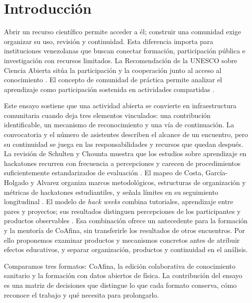 \section{Introducción}
Abrir un recurso científico permite acceder a él; construir una comunidad exige organizar su uso, revisión y continuidad. Esta diferencia importa para instituciones venezolanas que buscan conectar formación, participación pública e investigación con recursos limitados. La Recomendación de la UNESCO sobre Ciencia Abierta sitúa la participación y la cooperación junto al acceso al conocimiento \cite{unesco}. El concepto de comunidad de práctica permite analizar el aprendizaje como participación sostenida en actividades compartidas \cite{wenger}.

Este ensayo sostiene que una actividad abierta se convierte en infraestructura comunitaria cuando deja tres elementos vinculados: una contribución identificable, un mecanismo de reconocimiento y una vía de continuación. La convocatoria y el número de asistentes describen el alcance de un encuentro, pero su continuidad se juega en las responsabilidades y recursos que quedan después. La revisión de Schulten y Chounta muestra que los estudios sobre aprendizaje en hackatones recurren con frecuencia a percepciones y carecen de procedimientos suficientemente estandarizados de evaluación \cite{hacklearning}. El mapeo de Costa, García-Holgado y Alvarez organiza marcos metodológicos, estructuras de organización y métricas de hackatones estudiantiles, y señala límites en su seguimiento longitudinal \cite{hackmapping}. El modelo de \emph{hack weeks} combina tutoriales, aprendizaje entre pares y proyectos; sus resultados distinguen percepciones de los participantes y productos observables \cite{hackweeks}. Esa combinación ofrece un antecedente para la formación y la mentoría de CoAfina, sin transferirle los resultados de otros encuentros. Por ello proponemos examinar productos y mecanismos concretos antes de atribuir efectos educativos, y separar organización, productos y continuidad en el análisis.

Comparamos tres formatos: CoAfina, la edición colaborativa de conocimiento sanitario y la formación con datos abiertos de física. La contribución del ensayo es una matriz de decisiones que distingue lo que cada formato conserva, cómo reconoce el trabajo y qué necesita para prolongarlo.

